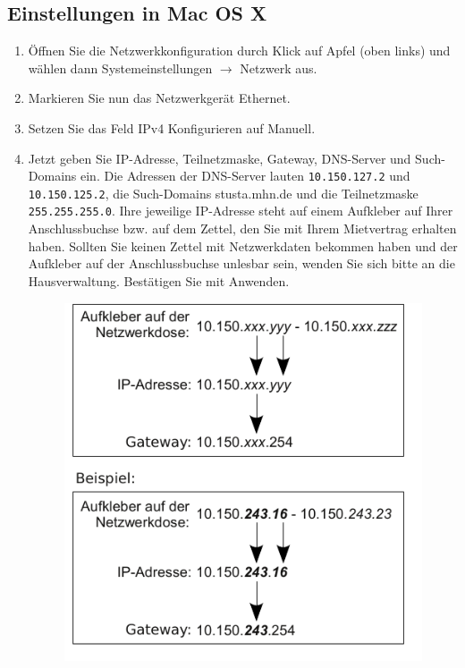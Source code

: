 \documentclass[a4paper,12pt]{scrartcl}
\begin{document}
\subsection*{Einstellungen in Mac OS X}
\begin{enumerate}
    \item Öffnen Sie die Netzwerkkonfiguration durch Klick auf Apfel (oben links) und wählen dann Systemeinstellungen $\rightarrow$ Netzwerk aus.
    \item Markieren Sie nun das Netzwerkgerät Ethernet.
    \item Setzen Sie das Feld IPv4 Konfigurieren auf Manuell.
    \item Jetzt geben Sie IP-Adresse, Teilnetzmaske, Gateway, DNS-Server und Such-Domains ein. Die Adressen der DNS-Server lauten \nolinkurl{10.150.127.2} und \nolinkurl{10.150.125.2}, die Such-Domains stusta.mhn.de und die Teilnetzmaske \nolinkurl{255.255.255.0}. Ihre jeweilige IP-Adresse steht auf einem Aufkleber auf Ihrer Anschlussbuchse bzw. auf dem Zettel, den Sie mit Ihrem Mietvertrag erhalten haben. Sollten Sie keinen Zettel mit Netzwerkdaten bekommen haben und der Aufkleber auf der Anschlussbuchse unlesbar sein, wenden Sie sich bitte an die Hausverwaltung. Bestätigen Sie mit Anwenden.
      \begin{figure}[h!]
      \centering
        \begin{minipage}[c]{0.38\linewidth}
          \centering
          \includegraphics[width=\linewidth,keepaspectratio]{Bilder/IP_Gerneric}

\end{minipage}
\end{figure}
\end{enumerate}
\end{document}
